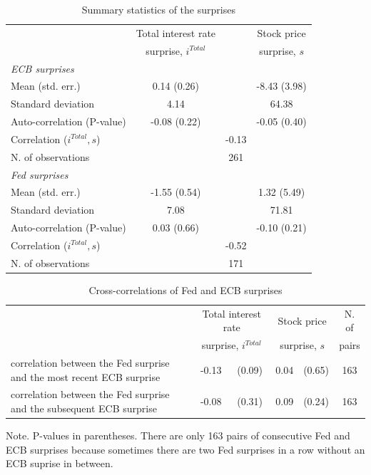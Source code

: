 \documentclass[a4paper,12pt]{article}
\begin{document}
\begin{table}[!htbp]
\begin{center}
\caption{Summary statistics of the surprises}\label{tab: surprises summary stats}
\begin{tabular}{lccc} \toprule
 & Total interest rate & & Stock price \\
 &  surprise, $i^{Total}$ & & surprise, $s$ \\
\midrule
\emph{ECB surprises}\\
Mean (std. err.) & 0.14 (0.26) & & -8.43 (3.98) \\
Standard deviation & 4.14 & & 64.38 \\
Auto-correlation (P-value) & -0.08 (0.22) & & -0.05 (0.40) \\
Correlation ($i^{Total},s$) & & -0.13 \\
N. of observations & & 261 \\
\midrule
\emph{Fed surprises}\\
Mean (std. err.) & -1.55 (0.54) & & 1.32 (5.49) \\
Standard deviation & 7.08 & & 71.81 \\
Auto-correlation (P-value) & 0.03 (0.66) & & -0.10 (0.21) \\
Correlation ($i^{Total},s$) & & -0.52 \\
N. of observations & & 171 \\
\bottomrule
\end{tabular}
\end{center}
\end{table}


\begin{table}[!htbp]
\begin{center}
\caption{Cross-correlations of Fed and ECB surprises}\label{tab: surprises correlations}
\begin{tabular}{p{7cm}ccccc} \toprule
 & \multicolumn{2}{c}{Total interest rate} &  \multicolumn{2}{c}{Stock price} & N. of\\
 &  \multicolumn{2}{c}{surprise, $i^{Total}$} &  \multicolumn{2}{c}{surprise, $s$} & pairs \\
\midrule
correlation between the Fed surprise and the most recent ECB surprise & -0.13 & (0.09) & 0.04 & (0.65) & 163 \\
correlation between the Fed surprise and the subsequent ECB surprise & -0.08 & (0.31) & 0.09 & (0.24) & 163 \\
\bottomrule
\end{tabular}
\end{center}\footnotesize
Note. P-values in parentheses. There are only 163 pairs of consecutive Fed and ECB surprises because sometimes there are two Fed surprises in a row without an ECB suprise in between.
\end{table}
\end{document}

